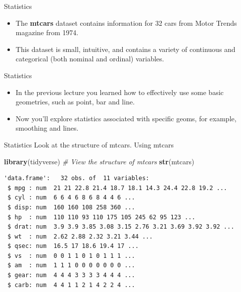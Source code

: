 \documentclass[
  ignorenonframetext,
]{beamer}
\newenvironment{Shaded}{\begin{snugshade}}{\end{snugshade}}
\newcommand{\CommentTok}[1]{\textcolor[rgb]{0.56,0.35,0.01}{\textit{#1}}}
\newcommand{\FunctionTok}[1]{\textcolor[rgb]{0.13,0.29,0.53}{\textbf{#1}}}
\newcommand{\NormalTok}[1]{#1}
\begin{document}
\begin{frame}{Statistics}
\label{statistics-2}
\begin{itemize}
\item
  The \textbf{mtcars} dataset contains information for 32 cars from
  Motor Trends magazine from 1974.
\item
  This dataset is small, intuitive, and contains a variety of continuous
  and categorical (both nominal and ordinal) variables.
\end{itemize}
\end{frame}

\begin{frame}{Statistics}
\label{statistics-3}
\begin{itemize}
\item
  In the previous lecture you learned how to effectively use some basic
  geometries, such as point, bar and line.
\item
  Now you'll explore statistics associated with specific geoms, for
  example, smoothing and lines.
\end{itemize}
\end{frame}

\begin{frame}[fragile]{Statistics}
\label{statistics-4}
Look at the structure of mtcars. Using mtcars

\begin{Shaded}
\begin{Highlighting}[]
\FunctionTok{library}\NormalTok{(tidyverse)}
\CommentTok{\# View the structure of mtcars}
\FunctionTok{str}\NormalTok{(mtcars)}
\end{Highlighting}
\end{Shaded}

\begin{verbatim}
'data.frame':   32 obs. of  11 variables:
 $ mpg : num  21 21 22.8 21.4 18.7 18.1 14.3 24.4 22.8 19.2 ...
 $ cyl : num  6 6 4 6 8 6 8 4 4 6 ...
 $ disp: num  160 160 108 258 360 ...
 $ hp  : num  110 110 93 110 175 105 245 62 95 123 ...
 $ drat: num  3.9 3.9 3.85 3.08 3.15 2.76 3.21 3.69 3.92 3.92 ...
 $ wt  : num  2.62 2.88 2.32 3.21 3.44 ...
 $ qsec: num  16.5 17 18.6 19.4 17 ...
 $ vs  : num  0 0 1 1 0 1 0 1 1 1 ...
 $ am  : num  1 1 1 0 0 0 0 0 0 0 ...
 $ gear: num  4 4 4 3 3 3 3 4 4 4 ...
 $ carb: num  4 4 1 1 2 1 4 2 2 4 ...
\end{verbatim}
\end{frame}
\end{document}
